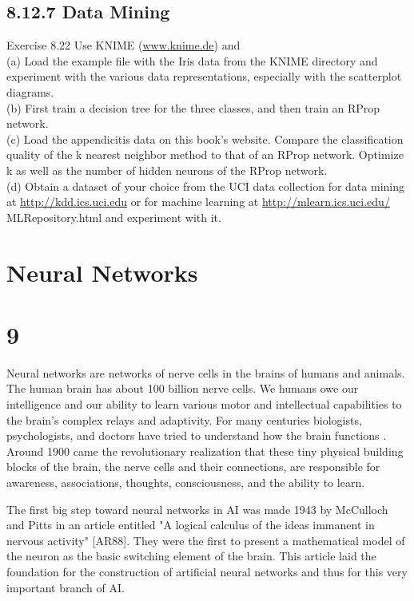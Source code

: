\documentclass[10pt]{article}
\begin{document}
\subsection*{8.12.7 Data Mining}
Exercise 8.22 Use KNIME (\href{http://www.knime.de}{www.knime.de}) and\\
(a) Load the example file with the Iris data from the KNIME directory and experiment with the various data representations, especially with the scatterplot diagrams.\\
(b) First train a decision tree for the three classes, and then train an RProp network.\\
(c) Load the appendicitis data on this book's website. Compare the classification quality of the k nearest neighbor method to that of an RProp network. Optimize k as well as the number of hidden neurons of the RProp network.\\
(d) Obtain a dataset of your choice from the UCI data collection for data mining at \href{http://kdd.ics.uci.edu}{http://kdd.ics.uci.edu} or for machine learning at \href{http://mlearn.ics.uci.edu/}{http://mlearn.ics.uci.edu/} MLRepository.html and experiment with it.

\section*{Neural Networks}
\section*{9}
Neural networks are networks of nerve cells in the brains of humans and animals. The human brain has about 100 billion nerve cells. We humans owe our intelligence and our ability to learn various motor and intellectual capabilities to the brain's complex relays and adaptivity. For many centuries biologists, psychologists, and doctors have tried to understand how the brain functions
. Around 1900 came the revolutionary realization that these tiny physical building blocks of the brain, the nerve cells and their connections, are responsible for awareness, associations, thoughts, consciousness, and the ability to learn.

The first big step toward neural networks in AI was made 1943 by McCulloch and Pitts in an article entitled "A logical calculus of the ideas immanent in nervous activity" [AR88]. They were the first to present a mathematical model of the neuron as the basic switching element of the brain. This article laid the foundation for the construction of artificial neural networks and thus for this very important branch of AI.
\end{document}

